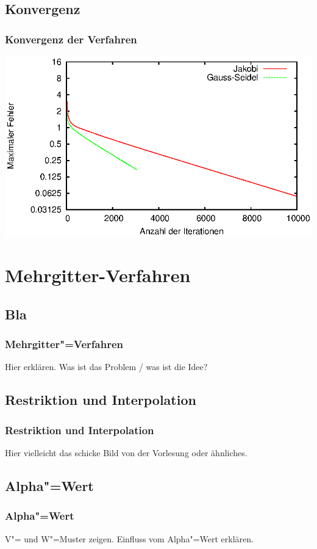 \documentclass{beamer}
\begin{document}
\subsection{Konvergenz}
\begin{frame}
    \frametitle{Konvergenz der Verfahren}
    \includegraphics[width=\textwidth]{plots/fehlerpres}
\end{frame}

\section{Mehrgitter-Verfahren}
\subsection{Bla}
\begin{frame}
    \frametitle{Mehrgitter"=Verfahren}
    Hier erklären. Was ist das Problem / was ist die Idee?
\end{frame}

\subsection{Restriktion und Interpolation}
\begin{frame}
    \frametitle{Restriktion und Interpolation}
    Hier vielleicht das schicke Bild von der Vorlesung oder ähnliches.
\end{frame}

\subsection{Alpha"=Wert} %
\begin{frame}
    \frametitle{Alpha"=Wert}
    V"= und W"=Muster zeigen. Einfluss vom Alpha"=Wert erklären.
\end{frame}
\end{document}
